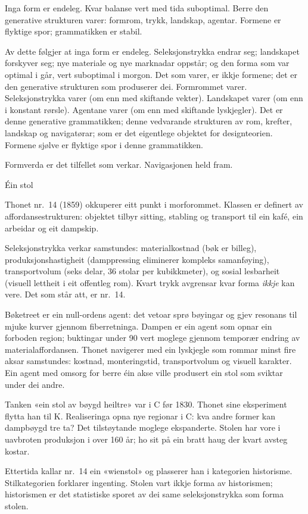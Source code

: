 Inga form er endeleg. Kvar balanse vert med tida suboptimal. Berre den generative strukturen varer: formrom, trykk, landskap, agentar. Formene er flyktige spor; grammatikken er stabil.

Av dette følgjer at inga form er endeleg. Seleksjonstrykka endrar seg; landskapet forskyver seg; nye materiale og nye marknadar oppstår; og den forma som var optimal i går, vert suboptimal i morgon. Det som varer, er ikkje formene; det er den generative strukturen som produserer dei. Formrommet varer. Seleksjonstrykka varer (om enn med skiftande vekter). Landskapet varer (om enn i konstant rørsle). Agentane varer (om enn med skiftande lyskjegler). Det er denne generative grammatikken; denne vedvarande strukturen av rom, krefter, landskap og navigatørar; som er det eigentlege objektet for designteorien. Formene sjølve er flyktige spor i denne grammatikken.

Formverda er det tilfellet som verkar. Navigasjonen held fram.

\begin{overgang}
Éin stol
\end{overgang}

\noindent Thonet nr.~14 (1859) okkuperer eitt punkt i morforommet. Klassen er definert av affordansestrukturen: objektet tilbyr sitting, stabling og transport til ein kafé, ein arbeidar og eit dampskip.

Seleksjonstrykka verkar samstundes: materialkostnad (bøk er billeg), produksjonshastigheit (damppressing eliminerer kompleks samanføying), transportvolum (seks delar, 36 stolar per kubikkmeter), og sosial lesbarheit (visuell lettheit i eit offentleg rom). Kvart trykk avgrensar kvar forma \textit{ikkje} kan vere. Det som står att, er nr.~14.

Bøketreet er ein null-ordens agent: det vetoar sprø bøyingar og gjev resonans til mjuke kurver gjennom fiberretninga. Dampen er ein agent som opnar ein forboden region; buktingar under 90\textdegree{} vert moglege gjennom temporær endring av materialaffordansen. Thonet navigerer med ein lyskjegle som rommar minst fire aksar samstundes: kostnad, monteringstid, transportvolum og visuell karakter. Ein agent med omsorg for berre éin akse ville produsert ein stol som sviktar under dei andre.

Tanken «ein stol av bøygd heiltre» var i C før 1830. Thonet sine eksperiment flytta han til K. Realiseringa opna nye regionar i C: kva andre former kan dampbøygd tre ta? Det tilstøytande moglege ekspanderte. Stolen har vore i uavbroten produksjon i over 160 år; ho sit på ein bratt haug der kvart avsteg kostar.

Ettertida kallar nr.~14 ein «wienstol» og plasserer han i kategorien historisme. Stilkategorien forklarer ingenting. Stolen vart ikkje forma av historismen; historismen er det statistiske sporet av dei same seleksjonstrykka som forma stolen.



